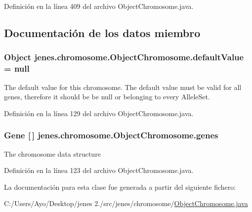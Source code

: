 Definición en la línea 409 del archivo Object\-Chromosome.\-java.



\subsection{Documentación de los datos miembro}
\hypertarget{classjenes_1_1chromosome_1_1_object_chromosome_af5e2ac0b5272d948ec566f824baa3411}{
\subsubsection[{default\-Value}]{\setlength{\rightskip}{0pt plus 5cm}Object jenes.\-chromosome.\-Object\-Chromosome.\-default\-Value = null\hspace{0.3cm}{\ttfamily [protected]}}}\label{classjenes_1_1chromosome_1_1_object_chromosome_af5e2ac0b5272d948ec566f824baa3411}
The default value for this chromosome. The default value must be valid for all genes, therefore it should be be {\ttfamily null} or belonging to every {\ttfamily Allele\-Set}. 

Definición en la línea 129 del archivo Object\-Chromosome.\-java.

\hypertarget{classjenes_1_1chromosome_1_1_object_chromosome_a33bb9e1cc526fe8e4be0417bbd05a127}{
\subsubsection[{genes}]{\setlength{\rightskip}{0pt plus 5cm}Gene \mbox{[}$\,$\mbox{]} jenes.\-chromosome.\-Object\-Chromosome.\-genes\hspace{0.3cm}{\ttfamily [protected]}}}\label{classjenes_1_1chromosome_1_1_object_chromosome_a33bb9e1cc526fe8e4be0417bbd05a127}
The chromosome data structure 

Definición en la línea 123 del archivo Object\-Chromosome.\-java.



La documentación para esta clase fue generada a partir del siguiente fichero\-:\begin{DoxyCompactItemize}
\item 
C\-:/\-Users/\-Ayo/\-Desktop/jenes 2./src/jenes/chromosome/\hyperlink{_object_chromosome_8java}{Object\-Chromosome.\-java}\end{DoxyCompactItemize}
